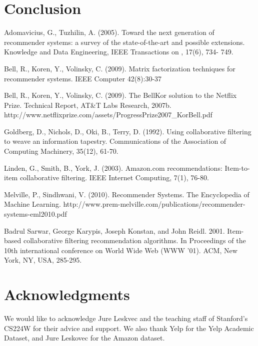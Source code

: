 \documentclass[letterpaper, 11 pt, conference]{ieeeconf}
\begin{document}
\section{Conclusion}


\begin{thebibliography}{99}

Adomavicius, G., Tuzhilin, A. (2005). Toward the next generation of recommender systems: a survey of the state-of-the-art and possible extensions. Knowledge and Data Engineering, IEEE Transactions on , 17(6),  734- 749.

Bell, R., Koren, Y., Volinsky, C. (2009). Matrix factorization techniques for recommender systems. IEEE Computer 42(8):30-37

Bell, R., Koren, Y., Volinsky, C. (2009). 
The BellKor solution to the Netﬂix Prize. Technical Report, AT\&T Labs 
Research, 2007b. 
http://www.netflixprize.com/assets/ProgressPrize2007\_KorBell.pdf


Goldberg, D., Nichols, D., Oki, B., Terry, D. (1992). 
Using collaborative filtering to weave an information tapestry. 
Communications of the Association of Computing Machinery, 35(12), 61-70.

Linden, G., Smith, B., York, J. (2003). Amazon.com recommendations: Item-to-item collaborative filtering. IEEE Internet
Computing, 7(1), 76-80.

Melville, P., Sindhwani, V. (2010).
Recommender Systems. The Encyclopedia of Machine Learning. 
http://www.prem-melville.com/publications/recommender-systems-eml2010.pdf

Badrul Sarwar, George Karypis, Joseph Konstan, and John Reidl. 2001.
Item-based collaborative filtering recommendation algorithms.
In Proceedings of the 10th international conference on World Wide Web (WWW '01). ACM, New York, NY, USA, 285-295. 

\end{thebibliography}

\section{Acknowledgments}
We would like to acknowledge Jure Leskvec and the teaching staff of 
Stanford's CS224W for their advice and support. We also thank Yelp for the 
Yelp Academic Dataset, and Jure Leskovec for the Amazon dataset.
\end{document}
